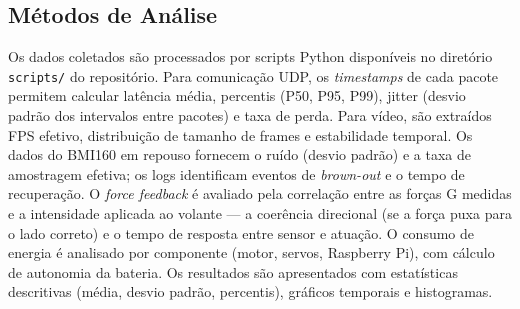 \subsection{Métodos de Análise}
\label{subsec:metodos-analise}

Os dados coletados são processados por scripts Python disponíveis no diretório \texttt{scripts/} do repositório. Para comunicação \gls{UDP}, os \textit{timestamps} de cada pacote permitem calcular latência média, percentis (P50, P95, P99), \gls{jitter} (desvio padrão dos intervalos entre pacotes) e taxa de perda. Para vídeo, são extraídos \gls{FPS} efetivo, distribuição de tamanho de frames e estabilidade temporal. Os dados do BMI160 em repouso fornecem o ruído (desvio padrão) e a taxa de amostragem efetiva; os logs identificam eventos de \textit{brown-out} e o tempo de recuperação. O \textit{force feedback} é avaliado pela correlação entre as forças G medidas e a intensidade aplicada ao volante --- a coerência direcional (se a força puxa para o lado correto) e o tempo de resposta entre sensor e atuação. O consumo de energia é analisado por componente (motor, servos, Raspberry Pi), com cálculo de autonomia da bateria. Os resultados são apresentados com estatísticas descritivas (média, desvio padrão, percentis), gráficos temporais e histogramas.


